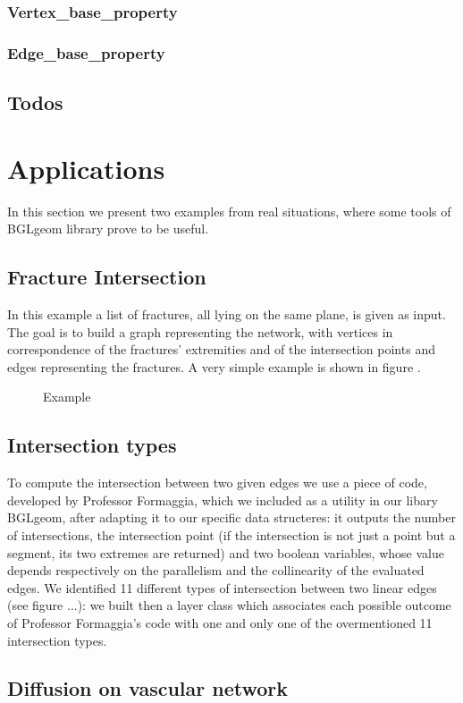 \documentclass[11pt]{article} %
\begin{document}
		\subsubsection{Vertex\_base\_property}
		
		\subsubsection{Edge\_base\_property}
	
	\subsection{Todos}	%


\section{Applications}

	In this section we present two examples from real situations, where some tools of BGLgeom library prove to be useful.

	\subsection{Fracture Intersection}
		In this example a list of fractures, all lying on the same plane, is given as input. The goal is to build a graph representing the network, with vertices in correspondence of the fractures' extremities and of the intersection points  and edges representing the fractures. A very simple example is shown in figure \label{fig:frac_int}.
		\begin{figure}
			\centering 
			\caption{Example}
			\label{fig:frac_int}
		\end{figure}
		
		\subsection{Intersection types}
			To compute the intersection between two given edges we use a piece of code, developed by Professor Formaggia, which we included as a utility in our libary BGLgeom, after adapting it to our specific data structeres: it outputs the number of intersections, the intersection point (if the intersection is not just a point but a segment, its two extremes are returned) and two boolean variables, whose value depends respectively on the parallelism and the collinearity of the evaluated edges. \newline
			We identified 11 different types of intersection between two linear edges (see figure ...): we built then a layer class which associates each possible outcome of Professor Formaggia's code with one and only one of the overmentioned 11 intersection types. \newline
			
		



	\subsection{Diffusion on vascular network}
\end{document}
